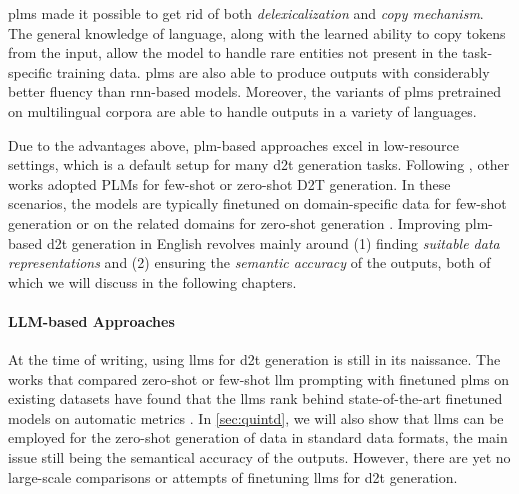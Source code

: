 {\acp{plm} made it possible to get rid of both \emph{delexicalization} and \emph{copy mechanism}. The general knowledge of language, along with the learned ability to copy tokens from the input, allow the model to handle rare entities not present in the task-specific training data. \acp{plm} are also able to produce outputs with considerably better fluency than \ac{rnn}-based models. Moreover, the variants of \acp{plm} pretrained on multilingual corpora \cite{liuMultilingualDenoisingPretraining2020,xueMT5MassivelyMultilingual2021} are able to handle outputs in a variety of languages.

Due to the advantages above, \ac{plm}-based approaches excel in low-resource settings, which is a default setup for many \ac{d2t} generation tasks. Following \citet{chenFewShotNLGPreTrained2019}, other works adopted PLMs for few-shot or zero-shot D2T generation. In these scenarios, the models are typically finetuned on domain-specific data for few-shot generation \cite{changNeuralDatatoTextGeneration2021,suFewShotTabletoTextGeneration2021} or on the related domains for zero-shot generation \cite{kasner2022neural,kasnerMindLabelsDescribing2022}. Improving \ac{plm}-based \ac{d2t} generation in English revolves mainly around (1) finding \emph{suitable data representations} and (2) ensuring the \emph{semantic accuracy} of the outputs, both of which we will discuss in the following chapters.

\paragraph{LLM-based Approaches} At the time of writing, using \acp{llm} for \ac{d2t} generation is still in its naissance. The works that compared zero-shot or few-shot \ac{llm} prompting with finetuned \acp{plm} on existing datasets have found that the \acp{llm} rank behind state-of-the-art finetuned models on automatic metrics \cite{axelssonUsingLargeLanguage2023,yuanEvaluatingGenerativeModels2023}. In \autoref{sec:quintd}, we will also show that \acp{llm} can be employed for the zero-shot generation of data in standard data formats, the main issue still being the semantical accuracy of the outputs. However, there are yet no large-scale comparisons or attempts of finetuning \acp{llm} for \ac{d2t} generation.


}
